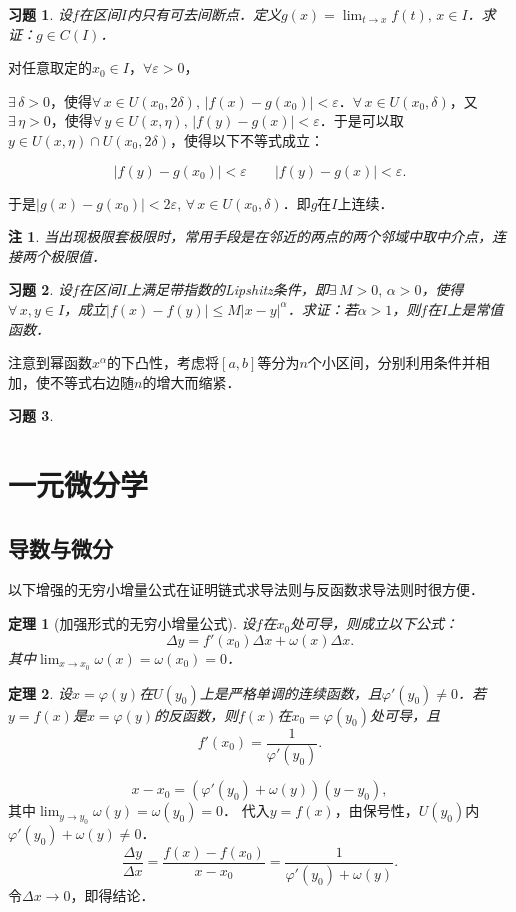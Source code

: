 \documentclass[11pt,a4paper]{ctexart}
\makeatletter
\theoremstyle{thmseries} %
\newtheorem{thm}{定理}[section]
\theoremstyle{exerseries}
\newtheorem{exer}{习题}[section]
\newtheorem*{rem}{注}
\renewenvironment{proof}[1][\proofname]{\par
  \pushQED{\qed}%
  \normalfont \topsep6\p@\@plus6\p@\relax
  \trivlist
  \item[\hskip\labelsep
        \itshape
    #1\@addpunct{}]\ignorespaces
}{%
  \popQED\endtrivlist\@endpefalse
}
\newenvironment{pf}{\begin{proof}[\bfseries\upshape 证\quad]}{\end{proof}}
\newcommand{\bra}[1]{\mathopen{}\left(#1\right)}
\renewcommand{\epsilon}{\varepsilon}
\renewcommand{\phi}{\varphi}
\makeatother
\begin{document}
\begin{exer}
	设$f$在区间$I$内只有可去间断点．定义$g(x)=\lim_{t\to x}f(t),\,x\in I$．求证：$g\in C(I)$．
\end{exer}
\begin{pf}
	对任意取定的$x_0\in I$，$\forall \epsilon>0$，

	$\exists\,\delta>0$，使得$\forall\, x\in U(x_0,2\delta),\,|f(x)-g(x_0)|<\epsilon$．$\forall\,x\in U(x_0,\delta)$，又$\exists\,\eta>0$，使得$\forall\,y\in U(x,\eta),\,|f(y)-g(x)|<\epsilon$．于是可以取$y\in U(x,\eta)\cap U(x_0,2\delta)$，使得以下不等式成立：

	\[|f(y)-g(x_0)|<\epsilon\qquad|f(y)-g(x)|<\epsilon.\]

	于是$|g(x)-g(x_0)|<2\epsilon,\,\forall\,x\in U(x_0,\delta)$．即$g$在$I$上连续．
\end{pf}
\begin{rem}
	当出现极限套极限时，常用手段是在邻近的两点的两个邻域中取中介点，连接两个极限值．
\end{rem}

\begin{exer}
	设$f$在区间$I$上满足带指数的Lipshitz条件，即$\exists\,M>0,\,\alpha>0$，使得$\forall\,x,y\in I$，成立$|f(x)-f(y)|\leq M|x-y|^\alpha$．求证：若$\alpha>1$，则$f$在$I$上是常值函数．
\end{exer}
\begin{pf}
	注意到幂函数$x^\alpha$的下凸性，考虑将$[a,b]$等分为$n$个小区间，分别利用条件并相加，使不等式右边随$n$的增大而缩紧．
\end{pf}

\begin{exer}

\end{exer}


\section{一元微分学}
\subsection{导数与微分}
以下增强的无穷小增量公式在证明链式求导法则与反函数求导法则时很方便．
\begin{thm}[加强形式的无穷小增量公式]
	设$f$在$x_0$处可导，则成立以下公式：
	\[\Delta y=f'(x_0)\Delta x+\omega(x)\Delta x.\]
	其中$\lim_{x\to x_0}\omega(x)=\omega(x_0)=0$．
\end{thm}

\begin{thm}
	设$x=\phi(y)$在$U(y_0)$上是严格单调的连续函数，且$\phi'(y_0)\neq0$．若$y=f(x)$是$x=\phi(y)$的反函数，则$f(x)$在$x_0=\phi(y_0)$处可导，且
	\[f'(x_0)=\frac{1}{\phi'(y_0)}.\]
\end{thm}
\begin{pf}
	\[x-x_0=\bra{\phi'(y_0)+\omega(y)}(y-y_0),\]
	其中$\lim_{y\to y_0}\omega(y)=\omega(y_0)=0$．
	代入$y=f(x)$，由保号性，$U(y_0)$内$\phi'(y_0)+\omega(y)\neq0$．
	\[\frac{\Delta y}{\Delta x}=\frac{f(x)-f(x_0)}{x-x_0}=\frac{1}{\phi'(y_0)+\omega(y)}.\]
	令$\Delta x\to0$，即得结论．
\end{pf}
\end{document}

